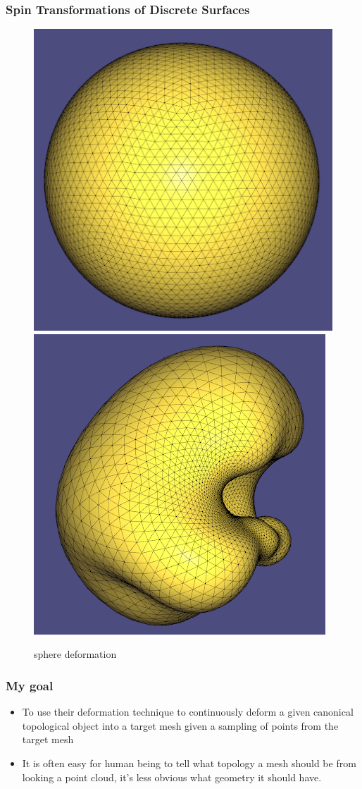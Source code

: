 \documentclass{beamer}
\begin{document}
\begin{frame}
\frametitle{Spin Transformations of Discrete Surfaces}
\begin{figure}[htp]
\centering
\includegraphics[scale=0.4]{sphere.PNG}\hfill
\includegraphics[scale=0.4]{spin_deformed_sphere.PNG}
\caption{sphere deformation}
\label{fig:spin_deformed_sphere}
\end{figure}
\end{frame}

\begin{frame}
\frametitle{My goal}
\begin{itemize}
\item To use their deformation technique to continuously deform a given canonical topological object into a target mesh given a sampling of points from the target mesh
\item It is often easy for human being to tell what topology a mesh should be from looking a point cloud, it's less obvious what geometry it should have.
\end{itemize}
\end{frame}
\end{document}
